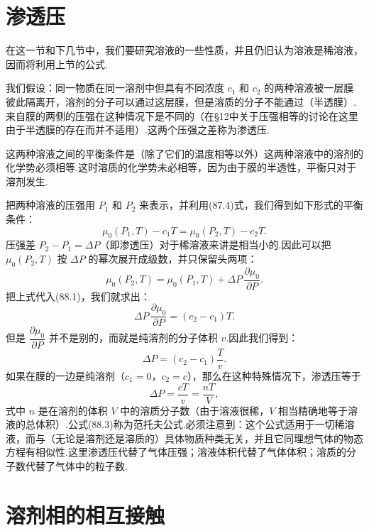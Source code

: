 \section{渗透压}

在这一节和下几节中，我们要研究溶液的一些性质，并且仍旧认为溶液是稀溶液，因而将利用上节的公式.

我们假设：同一物质在同一溶剂中但具有不同浓度 $c_1$ 和 $c_2$ 的两种溶液被一层膜彼此隔离开，溶剂的分子可以通过这层膜，但是溶质的分子不能通过（半透膜）.来自膜的两侧的压强在这种情况下是不同的（在§12中关于压强相等的讨论在这里由于半透膜的存在而并不适用）.这两个压强之差称为渗透压.

这两种溶液之间的平衡条件是（除了它们的温度相等以外）这两种溶液中的溶剂的化学势必须相等.这时溶质的化学势未必相等，因为由于膜的半透性，平衡只对于溶剂发生.

把两种溶液的压强用 $P_1$ 和 $P_2$ 来表示，并利用(87.4)式，我们得到如下形式的平衡条件：
\begin{equation}
  \mu_0(P_1,T)-c_1T=\mu_0(P_2,T)-c_2T.
\end{equation}
压强差 $P_2-P_1=\Delta P$（即渗透压）对于稀溶液来讲是相当小的.因此可以把 $\mu_0(P_2,T)$ 按 $\Delta P$ 的幂次展开成级数，并只保留头两项：
\begin{equation*}
  \mu_0(P_2,T)=\mu_0(P_1,T)+\Delta P\,\frac{\partial\mu_0}{\partial P}.
\end{equation*}
把上式代入(88.1)，我们就求出：
\begin{equation*}
  \Delta P\,\frac{\partial\mu_0}{\partial P}=(c_2-c_1)T.
\end{equation*}
但是 $\dfrac{\partial\mu_0}{\partial P}$ 并不是别的，而就是纯溶剂的分子体积 $v$.因此我们得到：
\begin{equation}
  \Delta P=(c_2-c_1)\frac{T}{v}.
\end{equation}
如果在膜的一边是纯溶剂（$c_1=0$，$c_2=c$），那么在这种特殊情况下，渗透压等于
\begin{equation}
  \Delta P=\frac{cT}{v}=\frac{nT}{V},
\end{equation}
式中 $n$ 是在溶剂的体积 $V$ 中的溶质分子数（由于溶液很稀，$V$ 相当精确地等于溶液的总体积）.公式(88.3)称为范托夫公式.必须注意到：这个公式适用于一切稀溶液，而与（无论是溶剂还是溶质的）具体物质种类无关，并且它同理想气体的物态方程有相似性.这里渗透压代替了气体压强；溶液体积代替了气体体积；溶质的分子数代替了气体中的粒子数.

\section{溶剂相的相互接触}

